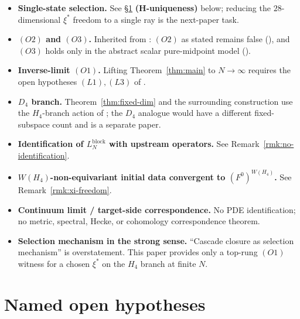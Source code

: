 \documentclass[11pt]{article}
\theoremstyle{definition}
\begin{document}
\begin{itemize}[leftmargin=2em]
\item \textbf{Single-state selection.} See \S\ref{sec:open-hyp}
  \textbf{(H-uniqueness)} below; reducing the $28$-dimensional $\xi^{*}$
  freedom to a single ray is the next-paper task.
\item \textbf{$(O2)$ and $(O3)$.} Inherited from
  \cite{RefinementCompat}: $(O2)$ as stated remains false
  (\cite[Proposition~\texttt{prop:strict-fails}]{RefinementCompat}),
  and $(O3)$ holds only in the abstract scalar pure-midpoint
  model
  (\cite[Theorem~\texttt{thm:O3-discharge}]{RefinementCompat}).
\item \textbf{Inverse-limit $(O1)$.} Lifting Theorem~\ref{thm:main}
  to $N \to \infty$ requires the open hypotheses $(L1), (L3)$
  of \cite[\S\texttt{sec:scope-and-gap}]{RefinementCompat}.
\item \textbf{$D_4$ branch.} Theorem~\ref{thm:fixed-dim} and the
  surrounding construction use the $H_4$-branch action of
  \cite[Definition~\texttt{def:coxeter}]{RefinementSpaces}; the
  $D_4$ analogue would have a different fixed-subspace count and
  is a separate paper.
\item \textbf{Identification of $L_N^{\mathrm{block}}$ with
  upstream operators.} See Remark~\ref{rmk:no-identification}.
\item \textbf{$W(H_4)$-non-equivariant initial data convergent to
  $(F^0)^{W(H_4)}$.} See Remark~\ref{rmk:xi-freedom}.
\item \textbf{Continuum limit / target-side correspondence.}
  No PDE identification; no metric, spectral, Hecke, or
  cohomology correspondence theorem.
\item \textbf{Selection mechanism in the strong sense.}
  ``Cascade closure as selection mechanism'' is overstatement.
  This paper provides only a top-rung $(O1)$ witness for a
  chosen $\xi^{*}$ on the $H_4$ branch at finite $N$.
\end{itemize}

\section{Named open hypotheses}
\label{sec:open-hyp}
\end{document}
